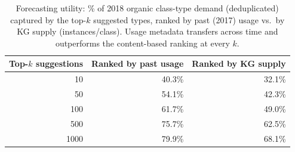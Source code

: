 \documentclass[sw]{iosart2x}
\providecommand{\DIFaddend}{} %
\DeclareRobustCommand{\DIFaddend}{\DIFOaddend \let\includegraphics\DIFOincludegraphics} %
\begin{document}
\DIFaddend \begin{table}[ht]
\centering
\caption{Forecasting utility: \% of 2018 organic class-type demand (deduplicated) captured by the top-$k$ suggested types, ranked by past (2017) usage vs.\ by KG supply (instances/class). Usage metadata transfers across time and outperforms the content-based ranking at every $k$.}
\label{tab:utility}
\begin{tabular}{r|r|r}
\hline
Top-$k$ suggestions & Ranked by past usage & Ranked by KG supply \\
\hline
10   & 40.3\% & 32.1\% \\
50   & 54.1\% & 42.3\% \\
100  & 61.7\% & 49.0\% \\
500  & 75.7\% & 62.5\% \\
1000 & 79.9\% & 68.1\% \\
\hline
\end{tabular}
\end{table}
\end{document}
